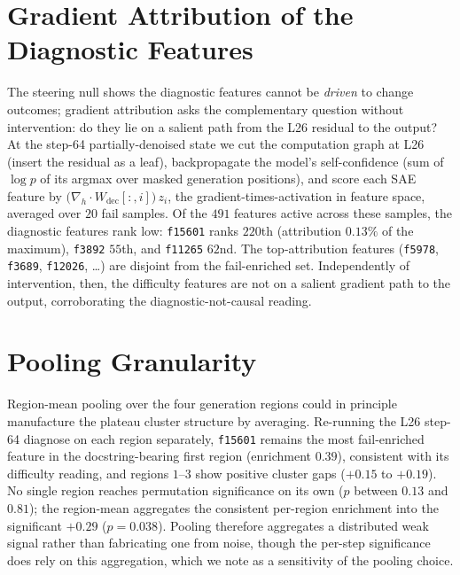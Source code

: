 \documentclass[11pt]{article}
\begin{document}
\section{Gradient Attribution of the Diagnostic Features}
\label{sec:appendix_gradattrib}

The steering null shows the diagnostic features cannot be \emph{driven} to change outcomes; gradient attribution asks the complementary question without intervention: do they lie on a salient path from the L26 residual to the output?
At the step-64 partially-denoised state we cut the computation graph at L26 (insert the residual as a leaf), backpropagate the model's self-confidence (sum of $\log p$ of its argmax over masked generation positions), and score each SAE feature by $\bigl(\nabla_h\!\cdot\!W_{\mathrm{dec}}[:,i]\bigr)\,z_i$, the gradient-times-activation in feature space, averaged over $20$ fail samples.
Of the $491$ features active across these samples, the diagnostic features rank low: \texttt{f15601} ranks $220$th (attribution $0.13\%$ of the maximum), \texttt{f3892} $55$th, and \texttt{f11265} $62$nd.
The top-attribution features (\texttt{f5978}, \texttt{f3689}, \texttt{f12026}, \dots) are disjoint from the fail-enriched set.
Independently of intervention, then, the difficulty features are not on a salient gradient path to the output, corroborating the diagnostic-not-causal reading.

\section{Pooling Granularity}
\label{sec:appendix_pooling}

Region-mean pooling over the four generation regions could in principle manufacture the plateau cluster structure by averaging.
Re-running the L26 step-64 diagnose on each region separately, \texttt{f15601} remains the most fail-enriched feature in the docstring-bearing first region (enrichment $0.39$), consistent with its difficulty reading, and regions $1$--$3$ show positive cluster gaps ($+0.15$ to $+0.19$).
No single region reaches permutation significance on its own ($p$ between $0.13$ and $0.81$); the region-mean aggregates the consistent per-region enrichment into the significant $+0.29$ ($p\!=\!0.038$).
Pooling therefore aggregates a distributed weak signal rather than fabricating one from noise, though the per-step significance does rely on this aggregation, which we note as a sensitivity of the pooling choice.
\end{document}
